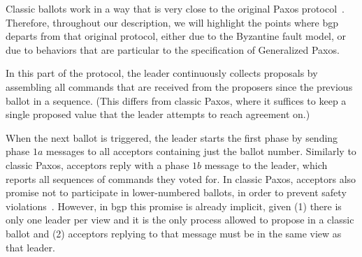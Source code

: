 Classic ballots work in a way that is very close to the original Paxos protocol~\cite{Lam98}. Therefore, throughout our description, we will highlight the points where \acrshort{bgp} departs from that original protocol, either due to the Byzantine fault model, or due to behaviors that are particular to the specification of Generalized Paxos.

In this part of the protocol, the leader continuously collects proposals by assembling all commands that are received from the proposers since the previous ballot in a sequence. (This differs from classic Paxos, where it suffices to keep a single proposed value that the leader attempts to reach agreement on.)

When the next ballot is triggered, the leader starts the first phase by sending phase $1a$ messages to all acceptors containing just the ballot number. Similarly to classic Paxos, acceptors reply with a phase $1b$ message to the leader, which reports all sequences of commands they voted for. In classic Paxos, acceptors also promise not to participate in lower-numbered ballots, in order to prevent safety violations~\cite{Lam98}. However, in \acrshort{bgp} this promise is already implicit, given (1) there is only one leader per view and it is the only process allowed to propose in a classic ballot and (2) acceptors replying to that message must be in the same view as that leader.

